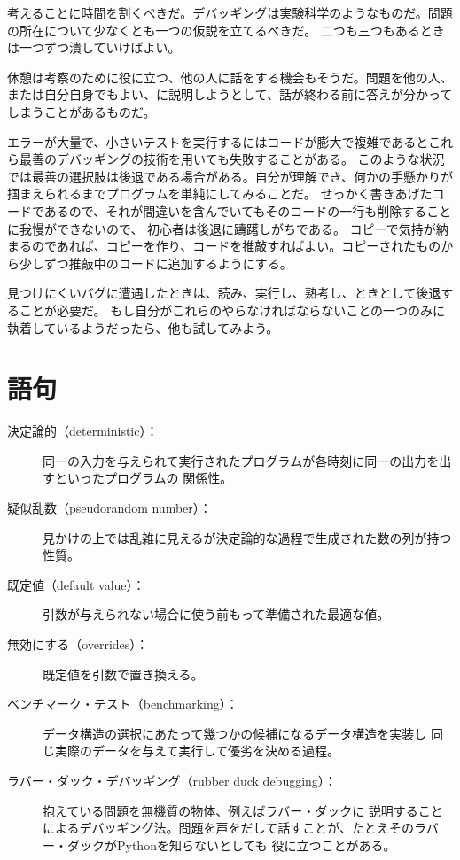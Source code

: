 \documentclass[a4j,12pt,makeidx]{jbook}
\begin{document}
考えることに時間を割くべきだ。デバッギングは実験科学のようなものだ。問題の所在について少なくとも一つの仮説を立てるべきだ。
二つも三つもあるときは一つずつ潰していけばよい。\par
休憩は考察のために役に立つ、他の人に話をする機会もそうだ。問題を他の人、
または自分自身でもよい、に説明しようとして、話が終わる前に答えが分かってしまうことがあるものだ。\par
エラーが大量で、小さいテストを実行するにはコードが膨大で複雑であるとこれら最善のデバッギングの技術を用いても失敗することがある。
このような状況では最善の選択肢は後退である場合がある。自分が理解でき、何かの手懸かりが掴まえられるまでプログラムを単純にしてみることだ。
せっかく書きあげたコードであるので、それが間違いを含んでいてもそのコードの一行も削除することに我慢ができないので、
初心者は後退に躊躇しがちである。
コピーで気持が納まるのであれば、コピーを作り、コードを推敲すればよい。コピーされたものから少しずつ推敲中のコードに追加するようにする。\par
見つけにくいバグに遭遇したときは、読み、実行し、熟考し、ときとして後退することが必要だ。
もし自分がこれらのやらなければならないことの一つのみに執着しているようだったら、他も試してみよう。
\section{語句}
\begin{description}

\item[決定論的（deterministic）：] 同一の入力を与えられて実行されたプログラムが各時刻に同一の出力を出すといったプログラムの
関係性。

\item[疑似乱数（pseudorandom number）：] 見かけの上では乱雑に見えるが決定論的な過程で生成された数の列が持つ性質。

\item[既定値（default value）：] 引数が与えられない場合に使う前もって準備された最適な値。

\item[無効にする（overrides）：] 既定値を引数で置き換える。

\item[ベンチマーク・テスト（benchmarking）：] データ構造の選択にあたって幾つかの候補になるデータ構造を実装し
同じ実際のデータを与えて実行して優劣を決める過程。 

\item[ラバー・ダック・デバッギング（rubber duck debugging）：] 抱えている問題を無機質の物体、例えばラバー・ダックに
説明することによるデバッギング法。問題を声をだして話すことが、たとえそのラバー・ダックがPythonを知らないとしても
役に立つことがある。

\end{description}
%
\end{document}
